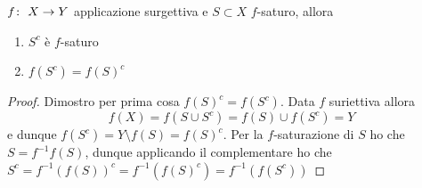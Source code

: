 \begin{lemma}
	$f \colon\ X \rightarrow Y$ applicazione surgettiva e $S \subset X$ $f$-saturo, allora 
	\begin{enumerate}
		\item $S^c$ è $f$-saturo 
		\item $f(S^c) = f(S)^c$
	\end{enumerate}
\end{lemma}
\begin{proof}
	Dimostro per prima cosa $f(S)^c = f(S^c)$. Data $f$ suriettiva allora 
	\begin{equation}
	f(X) = f(S \cup S^c) = f(S) \cup f(S^c) = Y
	\end{equation}
	e dunque $f(S^c) = Y \setminus f(S) = f(S)^c$. 
	Per la $f$-saturazione di $S$ ho che $S = f^{-1}f(S)$, dunque applicando il complementare ho che $S^c = f^{-1}(f(S))^c = f^{-1}(f(S)^c) = f^{-1}(f(S^c))$
\end{proof}

